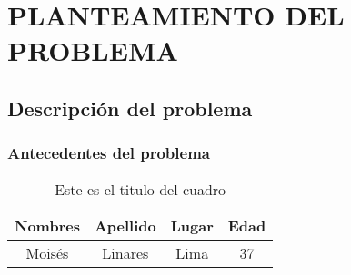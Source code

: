 \chapter{PLANTEAMIENTO DEL PROBLEMA}
    \section{Descripción del problema}
        \subsection{Antecedentes del problema}
        
    \lipsum[2]
    \begin{table}[h]
        \centering
        \begin{tabular}{|c|c|c|c|}
        \hline
        Nombres & Apellido & Lugar & Edad \\
        \hline
             Moisés & Linares & Lima & 37 \\
        \hline
        \end{tabular}
        \caption{Este es el titulo del cuadro}
        \label{tab:Primara Tabla}
    \end{table}